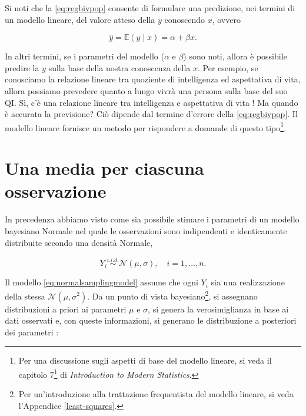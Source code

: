 \documentclass[
  11pt,
]{krantz}
\renewcommand{\href}[2]{#2\footnote{\url{#1}}}
\theoremstyle{definition}
\theoremstyle{definition}
\theoremstyle{definition}
\theoremstyle{definition}
\theoremstyle{remark}
\begin{document}
Si noti che la \eqref{eq:regbivpop} consente di formulare una predizione, nei termini di un modello lineare, del valore atteso della \(y\) conoscendo \(x\), ovvero

\begin{equation}
\hat{y} = \mathbb{E}(y \mid x) = \alpha + \beta x.
\label{eq:regbivpop2}
\end{equation}

In altri termini, se i parametri del modello (\(\alpha\) e \(\beta\)) sono noti, allora è possibile predire la \(y\) sulla base della nostra conoscenza della \(x\). Per esempio, se conosciamo la relazione lineare tra quoziente di intelligenza ed aspettativa di vita, allora possiamo prevedere quanto a lungo vivrà una persona sulla base del suo QI. Sì, c'è una relazione lineare tra intelligenza e aspettativa di vita \citep{hambrick2015research}! Ma quando è accurata la previsione? Ciò dipende dal termine d'errore della \eqref{eq:regbivpop}. Il modello lineare fornisce un metodo per rispondere a domande di questo tipo\footnote{Per una discussione sugli aspetti di base del modello lineare, si veda il \href{https://openintro-ims.netlify.app/model-slr.html}{capitolo 7} di \emph{Introduction to Modern Statistics}.}.

\hypertarget{una-media-per-ciascuna-osservazione}{%
\section{Una media per ciascuna osservazione}\label{una-media-per-ciascuna-osservazione}}

In precedenza abbiamo visto come sia possibile stimare i parametri di un modello bayesiano Normale nel quale le osservazioni sono indipendenti e identicamente distribuite secondo una densità Normale,

\begin{equation}
Y_i \stackrel{i.i.d.}{\sim} \mathcal{N}(\mu, \sigma), \quad i = 1, \dots, n.
\label{eq:normalsamplingmodel}
\end{equation}

Il modello \eqref{eq:normalsamplingmodel} assume che ogni \(Y_i\) sia una realizzazione della stessa \(\mathcal{N}(\mu, \sigma^2)\). Da un punto di vista bayesiano\footnote{Per un'introduzione alla trattazione frequentista del modello lineare, si veda l'Appendice \ref{least-squares}.}, si assegnano distribuzioni a priori ai parametri \(\mu\) e \(\sigma\), si genera la verosimiglianza in base ai dati osservati e, con queste informazioni, si generano le distribuzione a posteriori dei parametri \citep{gelman2020regression}:
\end{document}
